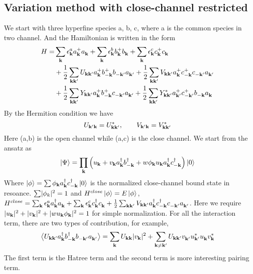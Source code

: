 \subsection{Variation method with close-channel restricted}

We start with three hyperfine species a, b, c, where a is the common species in two channel.  And the Hamiltonian is written in the form 
\begin{equation}
\begin{split}
 H=&\sum_\vk\epsilon^a_\vk{}a^+_\vk{}a^{}_\vk+\sum_\vk\epsilon^b_\vk{}b^+_\vk{}b^{}_\vk+\sum_\vk\epsilon^c_\vk{}c^+_\vk{}c^{}_\vk\\
  &+\nth{2}\sum_{\vk\vk'}U_{\vk\vk'}a^+_\vk{}b^+_{-\vk}{}b^{}_{-\vk'}a^{}_{\vk'}
	+\nth{2}\sum_{\vk\vk'}V_{\vk\vk'}a^+_\vk{}c^+_{-\vk}{}c^{}_{-\vk'}a^{}_{\vk'}\\
 &+\nth{2}\sum_{\vk\vk'}Y_{\vk\vk'}a^+_\vk{}b^+_{-\vk}{}c^{}_{-\vk'}a^{}_{\vk'}
	+\nth{2}\sum_{\vk\vk'}Y^*_{\vk\vk'}a^+_{\vk'}{}c^+_{-\vk'}{}b^{}_{-\vk}a^{}_{\vk}
\end{split} 
\end{equation}
By the Hermition condition we have 
\begin{equation}
 U_{\vk'\vk}=U^*_{\vk\vk'},\qquad{} V_{\vk'\vk}=V^*_{\vk\vk'}
\end{equation}
Here (a,b) is the open channel while (a,c) is the close channel.  We start from the ansatz as 
\begin{equation}\label{eq:ansatz}
 \ket{\Psi}=\prod_\vk\br{u_\vk+v_\vk{}a^\dg_\vk{}b^\dg_{-\vk}+w\phi_\vk{}u_\vk{}a^\dg_\vk{}c^\dg_{-\vk}}\ket{0}
\end{equation}
Where $\ket{\phi}=\sum\phi_\vk{}a^\dg_\vk{}c^\dg_{-\vk}\ket{0}$ is the normalized close-channel bound state in resoance.  $\sum\abs{\phi_k}^2=1$ and $H^{close}\ket{\phi}=E\ket{\phi}$, $H^{close}=\sum_\vk\epsilon^a_\vk{}a^\dg_\vk{}a^{}_\vk+\sum_\vk\epsilon^c_\vk{}c^\dg_\vk{}c^{}_\vk+\nth{2}\sum_{\vk\vk'}V_{\vk\vk'}a^\dg_\vk{}c^\dg_{-\vk}{}c^{}_{-\vk'}a^{}_{\vk'}$.
Here we require $\abs{u_\vk}^2+\abs{v_\vk}^2+\abs{wu_\vk\phi_\vk}^2=1$ for simple normalization.  For all the interaction term, there are two types of contribution,
for example, 
\begin{equation*}
\av{U_{\vk\vk'}a^\dg_\vk{}b^\dg_{-\vk}{}b^{}_{-\vk'}a^{}_{\vk'}}
=\sum_{\vk}U_{\vk\vk}\abs{v_\vk}^2+\sum_{\vk\neq\vk'}U_{\vk\vk'}v^{}_{\vk'}u^*_{\vk'}u^{}_\vk{}v^*_\vk
\end{equation*}
The first term is the Hatree term and the second term is more interesting pairing term. 


